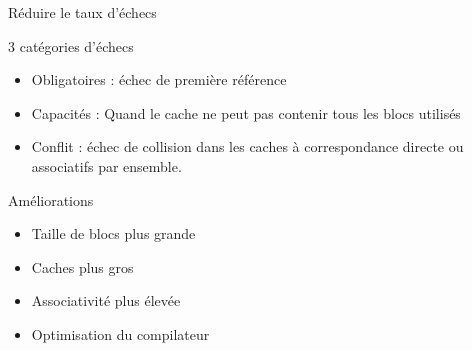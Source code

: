 %
\begin{Frame}{Réduire le taux d'échecs}


      \begin{block}{3 catégories d'échecs}
       \begin{center}
 	\begin{itemize}
         \item Obligatoires : échec de première référence
         \item Capacités : Quand le cache ne peut pas contenir tous les blocs utilisés
 	 \item Conflit : échec de collision dans les caches à correspondance directe ou associatifs par ensemble.
        \end{itemize}
       \end{center}
      \end{block}   

  


  

  \begin{block}{Améliorations}
    \begin{center}
 	\begin{itemize}
        \item Taille de blocs plus grande
        \item Caches plus gros
	\item Associativité plus élevée
	\item Optimisation du compilateur
        \end{itemize}
    \end{center}
  \end{block}   

 

\end{Frame}


